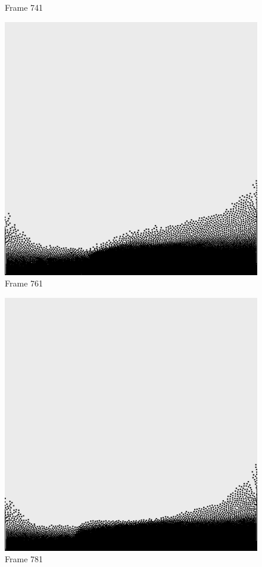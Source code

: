 \documentclass[a4paper, 12pt, oneside]{book}
\begin{document}
\begin{figure}[!ht]
\begin{center}
            Frame 741
        \end{center}
    \endminipage
    \hfill
        \begin{center}
            \includegraphics[width=\linewidth]{images/test_case_2/761.png}
            Frame 761
        \end{center}
    \endminipage
    \hfill
        \begin{center}
            \includegraphics[width=\linewidth]{images/test_case_2/781.png}
            Frame 781
        \end{center}
    \endminipage
    \hfill
\end{figure}
\end{document}
